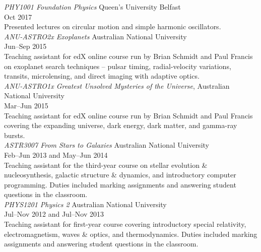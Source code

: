 \documentclass[11pt]{res} %
\begin{document}
\begin{resume}
  {\it PHY1001 Foundation Physics} \hfill Queen's University Belfast\\
  \null\hfill Oct 2017\\
  Presented lectures on circular motion and simple harmonic oscillators.\\

  {\it ANU-ASTRO2x Exoplanets} \hfill Australian National University\\
  \null\hfill Jun--Sep 2015\\
  Teaching assistant for edX online course run by Brian Schmidt and Paul Francis on exoplanet search techniques -- pulsar timing, radial-velocity variations, transits, microlensing, and direct imaging with adaptive optics.\\

  {\it ANU-ASTRO1x Greatest Unsolved Mysteries of the Universe}, \hfill Australian National University\\
  \null\hfill Mar--Jun 2015\\
  Teaching assistant for edX online course run by Brian Schmidt and Paul Francis covering the expanding universe, dark energy, dark matter, and gamma-ray bursts.\\

  {\it ASTR3007 From Stars to Galaxies} \hfill Australian National University\\
  \null\hfill Feb--Jun 2013 and May--Jun 2014\\
  Teaching assistant for the third-year course on stellar evolution \& nucleosynthesis, galactic structure \& dynamics, and introductory computer programming. Duties included marking assignments and answering student questions in the classroom.\\

  {\it PHYS1201 Physics 2} \hfill Australian National University\\
  \null\hfill Jul--Nov 2012 and Jul--Nov 2013\\
  Teaching assistant for first-year course covering introductory special relativity, electromagnetism, waves \& optics, and thermodynamics. Duties included marking assignments and answering student questions in the classroom.

\begin{comment}
\section{Referees}
  \textbf{Dr. Stuart Sim}\\
  Lecturer, Centre for Astrophysics Research\\
  Queen's University Belfast, UK\\
  stuart.sim@anu.edu.au


\end{comment}
\end{resume}
\end{document}
